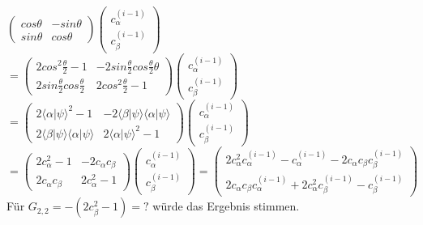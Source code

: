 \documentclass[a4paper]{scrartcl}
\begin{document}
\begin{enumerate}[a)]
$\begin{pmatrix} cos \theta & -sin \theta\\ sin \theta & cos \theta \end{pmatrix} \begin{pmatrix} c_{\alpha}^{(i-1)}\\ c_{\beta}^{(i-1)}\end{pmatrix}$\\
$= \begin{pmatrix} 2 cos^2 \frac{\theta}{2}-1 & -2 sin \frac{\theta}{2} cos \frac{\theta}{2} \theta\\ 2 sin \frac{\theta}{2} cos \frac{\theta}{2} & 2 cos^2 \frac{\theta}{2}-1 \end{pmatrix} \begin{pmatrix} c_{\alpha}^{(i-1)}\\ c_{\beta}^{(i-1)}\end{pmatrix}$\\
$= \begin{pmatrix} 2 \langle \alpha | \psi \rangle^2 -1 & -2 \langle \beta | \psi \rangle \langle \alpha | \psi \rangle \\ 2 \langle \beta | \psi \rangle \langle \alpha | \psi \rangle & 2 \langle \alpha | \psi \rangle^2 -1 \end{pmatrix} \begin{pmatrix} c_{\alpha}^{(i-1)}\\ c_{\beta}^{(i-1)}\end{pmatrix}$\\
$= \begin{pmatrix} 2 c_{\alpha}^2 -1 & -2 c_{\alpha}c_{\beta} \\ 2 c_{\alpha}c_{\beta} & 2 c_{\alpha}^2 -1 \end{pmatrix} \begin{pmatrix} c_{\alpha}^{(i-1)}\\ c_{\beta}^{(i-1)}\end{pmatrix}
= \begin{pmatrix} 2c_{\alpha}^2 c_{\alpha}^{(i-1)} -c_{\alpha}^{(i-1)} - 2c_{\alpha}c_{\beta} c_{\beta}^{(i-1)} \\ 2c_{\alpha}c_{\beta} c_{\alpha}^{(i-1)} + 2c_{\alpha}^2 c_{\beta}^{(i-1)} -c_{\beta}^{(i-1)}\end{pmatrix}$\\

Für $G_{2,2} = -(2 c_{\beta}^2 -1) = ?$ würde das Ergebnis stimmen.

\end{enumerate}
\end{document}
